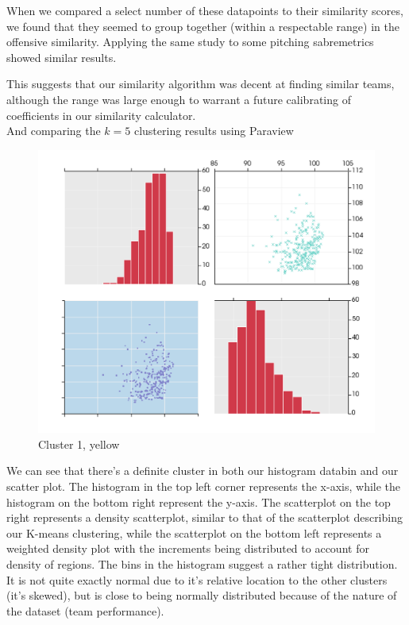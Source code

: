 \documentclass[12pt]{article}
\numberwithin{equation}{subsection}
\begin{document}
When we compared a select number of these datapoints to their similarity scores, we found that they seemed to group together (within a respectable range) in the offensive similarity. Applying the same study to some pitching sabremetrics showed similar results.

This suggests that our similarity algorithm was decent at finding similar teams, although the range was large enough to warrant a future calibrating of coefficients in our similarity calculator.\\

\noindent And comparing the $k=5$ clustering results using Paraview

\begin{figure}[H]
	\centering
    \includegraphics[width=0.9\linewidth]{cluster1}
    \caption{Cluster 1, yellow}
\end{figure}

\noindent We can see that there's a definite cluster in both our histogram databin and our scatter plot. The histogram in the top left corner represents the x-axis, while the histogram on the bottom right represent the y-axis. The scatterplot on the top right represents a density scatterplot, similar to that of the scatterplot describing our K-means clustering, while the scatterplot on the bottom left represents a weighted density plot with the increments being distributed to account for density of regions. The bins in the histogram suggest a rather tight distribution. It is not quite exactly normal due to it's relative location to the other clusters (it's skewed), but is close to being normally distributed because of the nature of the dataset (team performance).
\end{document}
